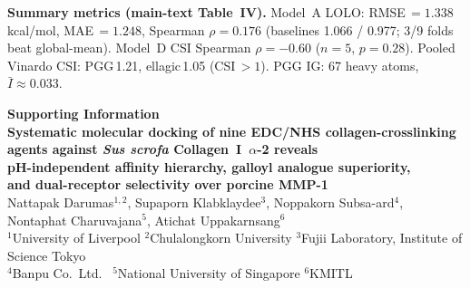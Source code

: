 \documentclass[11pt]{article}
\begin{document}
\noindent\textbf{Summary metrics (main-text Table~IV).}
Model~A LOLO: RMSE\,$= 1.338$\,kcal/mol, MAE\,$= 1.248$, Spearman
$\rho = 0.176$ (baselines 1.066 / 0.977; 3/9 folds beat global-mean).
Model~D CSI Spearman $\rho = -0.60$ ($n{=}5$, $p{=}0.28$).
Pooled Vinardo CSI: PGG\,1.21, ellagic\,1.05 (CSI\,$> 1$).
PGG IG: 67 heavy atoms, $\bar{I} \approx 0.033$.

\begin{center}
{\Large\bfseries Supporting Information}\\[8pt]
{\large\bfseries
  Systematic molecular docking of nine EDC/NHS collagen-crosslinking\\[3pt]
  agents against \textit{Sus scrofa} Collagen~I~$\alpha$-2 reveals\\[3pt]
  pH-independent affinity hierarchy, galloyl analogue superiority,\\[3pt]
  and dual-receptor selectivity over porcine MMP-1}\\[8pt]
Nattapak Darumas$^{1,2}$,
Supaporn Klabklaydee$^{3}$,
Noppakorn Subsa-ard$^{4}$,
Nontaphat Charuvajana$^{5}$,
Atichat Uppakarnsang$^{6}$\\[4pt]
{\small
$^{1}$University of Liverpool \quad
$^{2}$Chulalongkorn University \quad
$^{3}$Fujii Laboratory, Institute of Science Tokyo\\
$^{4}$Banpu Co.\ Ltd.\ \quad
$^{5}$National University of Singapore \quad
$^{6}$KMITL
}
\end{center}
\end{document}
